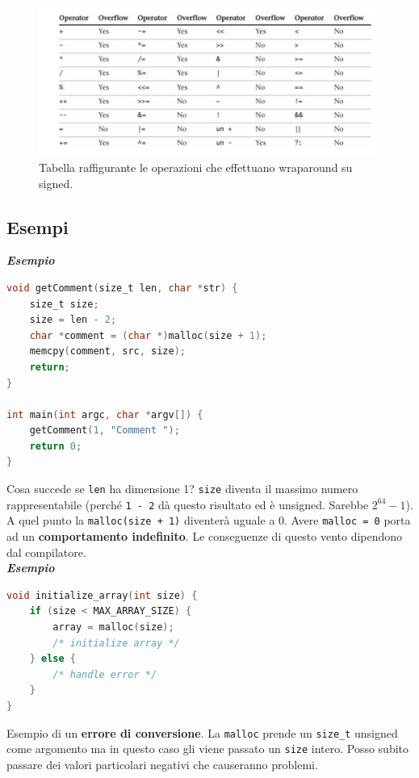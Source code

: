 \begin{figure}[H]
    \centering
    \includegraphics[width=12cm, keepaspectratio]{capitoli/secure_coding/img/cap_2/wraparound_signed.png}
    \caption{Tabella raffigurante le operazioni che effettuano wraparound su signed.}
\end{figure}

\newpage

\subsection{Esempi}

\textbf{\textit{Esempio}}

\begin{lstlisting}[language=C,  basicstyle=\scriptsize]
void getComment(size_t len, char *str) {
    size_t size;
    size = len - 2;
    char *comment = (char *)malloc(size + 1);
    memcpy(comment, src, size);
    return;
}

int main(int argc, char *argv[]) {
    getComment(1, "Comment ");
    return 0;
}\end{lstlisting}

Cosa succede se \verb|len| ha dimensione 1? \verb|size| diventa il massimo
numero rappresentabile (perché \verb|1 - 2| dà questo risultato ed è unsigned.
Sarebbe \(2^{64} - 1\)). A quel punto la \verb|malloc(size + 1)| diventerà uguale a
0. Avere \verb|malloc = 0| porta ad un \textbf{comportamento indefinito}. Le
conseguenze di questo vento dipendono dal compilatore.\\

\textbf{\textit{Esempio}}

\begin{lstlisting}[language=C,  basicstyle=\scriptsize]
void initialize_array(int size) {
    if (size < MAX_ARRAY_SIZE) {
        array = malloc(size);
        /* initialize array */
    } else {
        /* handle error */
    }
}\end{lstlisting}

Esempio di un \textbf{errore di conversione}. La \verb|malloc| prende un
\verb|size_t| unsigned come argomento ma in questo caso gli viene passato un
\verb|size| intero. Posso subito passare dei valori particolari negativi che
causeranno problemi.\\


